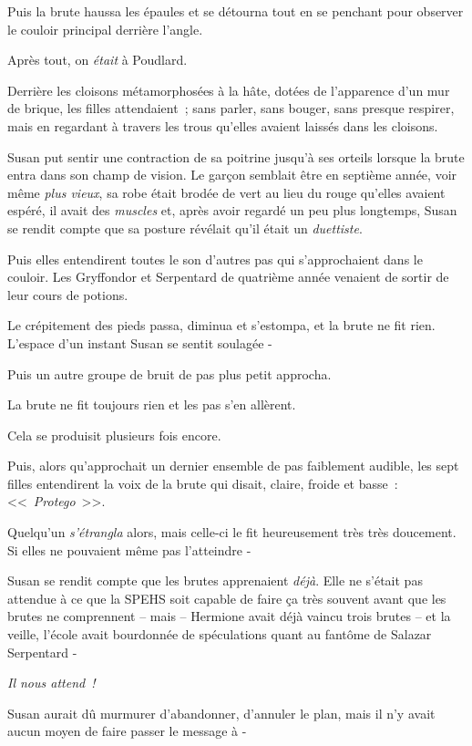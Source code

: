 Puis la brute haussa les épaules et se détourna tout en se penchant pour observer le couloir principal derrière l'angle.

Après tout, on \emph{était} à Poudlard.

Derrière les cloisons métamorphosées à la hâte, dotées de l'apparence d'un mur de brique, les filles attendaient~; sans parler, sans bouger, sans presque respirer, mais en regardant à travers les trous qu'elles avaient laissés dans les cloisons.

Susan put sentir une contraction de sa poitrine jusqu'à ses orteils lorsque la brute entra dans son champ de vision. Le garçon semblait être en septième année, voir même \emph{plus vieux}, sa robe était brodée de vert au lieu du rouge qu'elles avaient espéré, il avait des \emph{muscles} et, après avoir regardé un peu plus longtemps, Susan se rendit compte que sa posture révélait qu'il était un \emph{duettiste}.

Puis elles entendirent toutes le son d'autres pas qui s'approchaient dans le couloir. Les Gryffondor et Serpentard de quatrième année venaient de sortir de leur cours de potions.

Le crépitement des pieds passa, diminua et s'estompa, et la brute ne fit rien. L'espace d'un instant Susan se sentit soulagée -

Puis un autre groupe de bruit de pas plus petit approcha.

La brute ne fit toujours rien et les pas s'en allèrent.

Cela se produisit plusieurs fois encore.

Puis, alors qu'approchait un dernier ensemble de pas faiblement audible, les sept filles entendirent la voix de la brute qui disait, claire, froide et basse~: <<~\emph{Protego}~>>.

Quelqu'un \emph{s'étrangla} alors, mais celle-ci le fit heureusement très très doucement. Si elles ne pouvaient même pas l'atteindre -

Susan se rendit compte que les brutes apprenaient \emph{déjà}. Elle ne s'était pas attendue à ce que la SPEHS soit capable de faire ça très souvent avant que les brutes ne comprennent -- mais -- Hermione avait déjà vaincu trois brutes -- et la veille, l'école avait bourdonnée de spéculations quant au fantôme de Salazar Serpentard -

\emph{Il nous attend~!}

Susan aurait dû murmurer d'abandonner, d'annuler le plan, mais il n'y avait aucun moyen de faire passer le message à -

